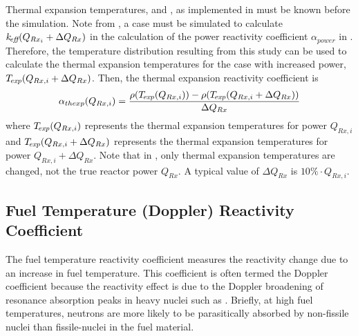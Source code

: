     Thermal expansion temperatures, \texpfuel and \texpstruct, as implemented in 
     must be known before the simulation. Note from
    , a case must be simulated to
    calculate $k_{\!\mbox{\scriptsize \em eff}}(Q_{Rx_i} + \Delta Q_{Rx})$ in the calculation of the power
    reactivity coefficient $\alpha_{power}$ in 
    .  Therefore, the temperature
    distribution resulting from this study can be used to calculate the thermal
    expansion temperatures for the case with increased power, 
    ${{T_{\!\mbox{\scriptsize \em exp}}}(Q_{Rx,i} + \Delta Q_{Rx})}$.
    Then, the thermal expansion reactivity coefficient is 
    \begin{equation}
      \label{eq:thermal_expansion_reactivity_coefficient}
      \alpha_{thexp}(Q_{Rx,i}) = \frac{\rho({T_{\!\mbox{\scriptsize \em exp}}}(Q_{Rx,i})) - 
        \rho({T_{\!\mbox{\scriptsize \em exp}}}(Q_{Rx,i} + \Delta Q_{Rx}))}
        {\Delta Q_{Rx}}
    \end{equation}
    where ${T_{\!\mbox{\scriptsize \em exp}}}(Q_{Rx,i})$ represents the thermal expansion temperatures for
    power $Q_{Rx,i}$ and ${T_{\!\mbox{\scriptsize \em exp}}}(Q_{Rx,i} + \Delta Q_{Rx})$ represents the
    thermal expansion temperatures for power $Q_{Rx,i} + \Delta Q_{Rx}$. Note
    that in , only thermal
    expansion temperatures are changed, not the true reactor power $Q_{Rx}$.
    A typical value of $\Delta Q_{Rx}$ is $10\% \cdot Q_{Rx,i}$.

  \subsection{Fuel Temperature (Doppler) Reactivity Coefficient}
  \label{sec:fuel_temperature_reactivity_coefficient}
    The fuel temperature reactivity coefficient measures the reactivity change 
    due to an increase in fuel temperature. This coefficient is often termed the
    Doppler coefficient because the reactivity effect is due to the Doppler
    broadening of resonance absorption peaks in heavy nuclei such as
     \cite{textbookknief}. Briefly, at high fuel temperatures, 
    neutrons are more likely to be parasitically absorbed by non-fissile nuclei
    than fissile-nuclei in the fuel material.

